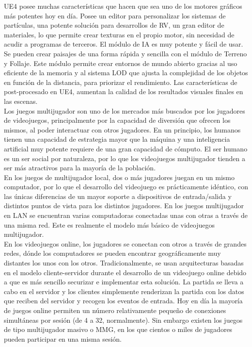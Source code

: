 \acs{UE4} posee muchas características que hacen que sea uno de los motores gráficos más potentes hoy en día. Posee un editor para personalizar los sistemas de partículas, una potente solución para desarrollos de \ac{RV}, un gran editor de materiales, lo que permite crear texturas en el propio motor, sin necesidad de acudir a programas de terceros. El módulo de \ac{IA} es muy potente y fácil de usar. Se pueden crear paisajes de una forma rápida y sencilla con el módulo de Terreno y Follaje. Este módulo permite crear entornos de mundo abierto gracias al uso eficiente de la memoria y al sistema \ac{LOD} que ajusta la complejidad de los objetos en función de la distancia, para priorizar el rendimiento. Las características de post-procesado en \acs{UE4}, aumentan la calidad de los resultados visuales finales en las escenas.\\


Los juegos multijugador \cite{7} son uno de los mercados más buscados por los jugadores de videojuegos, principalmente por la capacidad de diversión que ofrecen los mismos, al poder interactuar con otros jugadores. En un principio, los humanos tienen una capacidad de estrategia mayor que la máquina y una inteligencia artificial muy potente requiere de una gran capacidad de cómputo. El ser humano es un ser social por naturaleza, por lo que los videojuegos multijugador tienden a ser más atractivos para la mayoría de la población.\\


En los juegos de multijugador local, dos o más jugadores juegan en un mismo computador, por lo que el desarrollo del videojuego es prácticamente idéntico, con las únicas diferencias de un mayor soporte a dispositivos de entrada/salida y distintos puntos de vista para los distintos jugadores. En los juegos multijugador en \ac{LAN} se encuentran varias computadoras conectadas unas con otras a través de una misma red. Este es realmente el modelo más básico de videojuegos multijugador.\\


En los videojuegos online, los jugadores se conectan con otros a través de grandes redes, dónde los computadores se pueden encontrar geográficamente muy distantes los unos con los otros. Tradicionalmente, se usan arquitecturas basadas en el modelo cliente-servidor \cite{8} durante el desarrollo de un videojuego online debido a que es más sencillo securizar e implementar esta solución. La partida se lleva a cabo en el servidor y los clientes simplemente renderizan la partida con los datos que reciben del servidor y recogen los eventos de entrada. Hoy en día la mayoría de juegos online permiten un número relativamente pequeño de conexiones simultáneas por sesión (de 4 a 32, normalmente). Sin embargo existen los juegos de tipo multijugador masivo o \ac{MMG}, en los que cientos o miles de jugadores pueden participar en una misma sesión.\\


